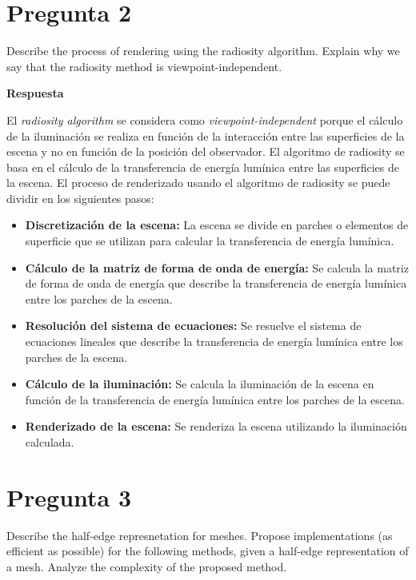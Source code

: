 \documentclass{article}
\begin{document}
\section{Pregunta 2}

Describe the process of rendering using the radiosity algorithm. Explain why we say that the radiosity method is viewpoint-independent.

\textbf{Respuesta}

El \textit{radiosity algorithm} se considera como \textit{viewpoint-independent} porque el cálculo de la iluminación se realiza en función de la interacción entre las superficies de la escena y no en función de la posición del observador. El algoritmo de radiosity se basa en el cálculo de la transferencia de energía lumínica entre las superficies de la escena. El proceso de renderizado usando el algoritmo de radiosity se puede dividir en los siguientes pasos:

\begin{itemize}
    \item \textbf{Discretización de la escena:} La escena se divide en parches o elementos de superficie que se utilizan para calcular la transferencia de energía lumínica.
    \item \textbf{Cálculo de la matriz de forma de onda de energía:} Se calcula la matriz de forma de onda de energía que describe la transferencia de energía lumínica entre los parches de la escena.
    \item \textbf{Resolución del sistema de ecuaciones:} Se resuelve el sistema de ecuaciones lineales que describe la transferencia de energía lumínica entre los parches de la escena.
    \item \textbf{Cálculo de la iluminación:} Se calcula la iluminación de la escena en función de la transferencia de energía lumínica entre los parches de la escena.
    \item \textbf{Renderizado de la escena:} Se renderiza la escena utilizando la iluminación calculada.
\end{itemize}


\section{Pregunta 3}

Describe the half-edge represnetation for meshes. Propose implementations (as efficient as possible) for the following methods, given a half-edge representation of a mesh. Analyze the complexity of the proposed method.
\end{document}
